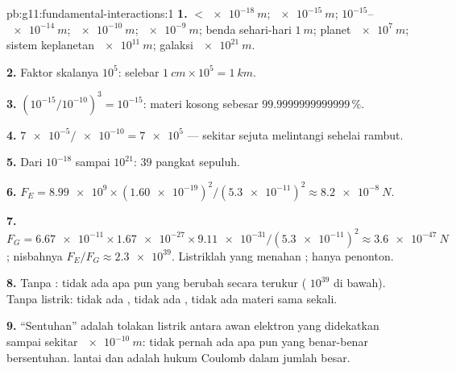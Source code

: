 \begin{solution}{pb:g11:fundamental-interactions:1}
\textbf{1.}  $< \qty{e-18}{m}$;  $\qty{e-15}{m}$; 
$10^{-15}$--$\qty{e-14}{m}$;  $\qty{e-10}{m}$; 
$\qty{e-9}{m}$; benda sehari-hari $\qty{1}{m}$; planet $\qty{e7}{m}$;
sistem keplanetan $\qty{e11}{m}$; galaksi $\qty{e21}{m}$.

\textbf{2.} Faktor skalanya $10^{5}$:  selebar
$\qty{1}{cm} \times 10^{5} = \qty{1}{km}$.

\textbf{3.} $(10^{-15}/10^{-10})^3 = 10^{-15}$: materi kosong sebesar
$\num{99.9999999999999}\,\%$.

\textbf{4.} $\num{7e-5}/\num{e-10} = \num{7e5}$  --- sekitar sejuta
 melintangi sehelai rambut.

\textbf{5.} Dari $10^{-18}$ sampai $10^{21}$: $39$ pangkat sepuluh.

\textbf{6.} $F_E = \num{8.99e9} \times (\num{1.60e-19})^2 /
(\num{5.3e-11})^2 \approx \qty{8.2e-8}{N}$.

\textbf{7.} $F_G = \num{6.67e-11} \times \num{1.67e-27} \times
\num{9.11e-31}/(\num{5.3e-11})^2 \approx \qty{3.6e-47}{N}$; nisbahnya
$F_E/F_G \approx \num{2.3e39}$. Listriklah yang menahan ;
 hanya penonton.

\textbf{8.} Tanpa : tidak ada apa pun yang berubah secara
terukur ( $10^{39}$ di bawah). Tanpa listrik: tidak ada
, tidak ada , tidak ada materi sama sekali.

\textbf{9.} ``Sentuhan'' adalah tolakan listrik antara awan elektron
 yang didekatkan sampai sekitar $\qty{e-10}{m}$: tidak pernah ada
apa pun yang benar-benar bersentuhan.  lantai dan 
adalah hukum Coulomb dalam jumlah besar.


\end{solution}
